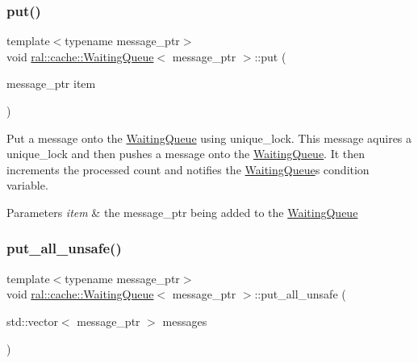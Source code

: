 \subsubsection{\texorpdfstring{put()}{put()}}
{\footnotesize\ttfamily template$<$typename message\+\_\+ptr$>$ \\
void \hyperlink{classral_1_1cache_1_1WaitingQueue}{ral\+::cache\+::\+Waiting\+Queue}$<$ message\+\_\+ptr $>$\+::put (\begin{DoxyParamCaption}\item[{message\+\_\+ptr}]{item }\end{DoxyParamCaption})\hspace{0.3cm}{\ttfamily [inline]}}

Put a message onto the \hyperlink{classral_1_1cache_1_1WaitingQueue}{Waiting\+Queue} using unique\+\_\+lock. This message aquires a unique\+\_\+lock and then pushes a message onto the \hyperlink{classral_1_1cache_1_1WaitingQueue}{Waiting\+Queue}. It then increments the processed count and notifies the \hyperlink{classral_1_1cache_1_1WaitingQueue}{Waiting\+Queue}\textquotesingle{}s condition variable. 
\begin{DoxyParams}{Parameters}
{\em item} & the message\+\_\+ptr being added to the \hyperlink{classral_1_1cache_1_1WaitingQueue}{Waiting\+Queue} \\
\hline
\end{DoxyParams}
\mbox{\label{classral_1_1cache_1_1WaitingQueue_a1ac476114c34c127aee7c43907088bea}} 
\subsubsection{\texorpdfstring{put\+\_\+all\+\_\+unsafe()}{put\_all\_unsafe()}}
{\footnotesize\ttfamily template$<$typename message\+\_\+ptr$>$ \\
void \hyperlink{classral_1_1cache_1_1WaitingQueue}{ral\+::cache\+::\+Waiting\+Queue}$<$ message\+\_\+ptr $>$\+::put\+\_\+all\+\_\+unsafe (\begin{DoxyParamCaption}\item[{std\+::vector$<$ message\+\_\+ptr $>$}]{messages }\end{DoxyParamCaption})\hspace{0.3cm}{\ttfamily [inline]}}


